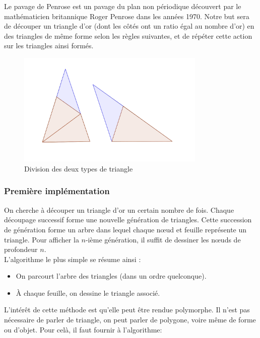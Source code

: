 \documentclass[a4paper,11pt]{article}
\begin{document}
Le pavage de Penrose est un pavage du plan non périodique découvert par le mathématicien
britannique Roger Penrose dans les années 1970.
Notre but sera de découper un triangle d'or (dont les côtés ont un ratio égal au nombre d'or)
en des triangles de même forme selon les règles suivantes,
et de répéter cette action sur les triangles ainsi formés.

\begin{figure}
  \centering
  \includegraphics[width=0.8\textwidth]{division_penrose.png}
  \caption{Division des deux types de triangle}
  \label{fig:penrose_example}
\end{figure}

\subsubsection{Première implémentation}
\label{sec:algoBasePenrose}
On cherche à découper un triangle d'or un certain nombre de fois. Chaque découpage successif
forme une nouvelle \og génération \fg de triangles. Cette succession de génération forme
un arbre dans lequel chaque nœud et feuille représente un triangle. Pour afficher la
$n$-ième génération, il suffit de dessiner les nœuds de profondeur $n$.\\

L'algorithme le plus simple se résume ainsi :

\begin{itemize}
  \item On parcourt l'arbre des triangles (dans un ordre quelconque).
  \item À chaque feuille, on dessine le triangle associé.\\
\end{itemize}

L'intérêt de cette méthode est qu'elle peut être rendue polymorphe. Il n'est pas nécessaire
de parler de triangle, on peut parler de polygone, voire même de forme ou d'objet.
Pour celà, il faut fournir à l'algorithme:
\end{document}

